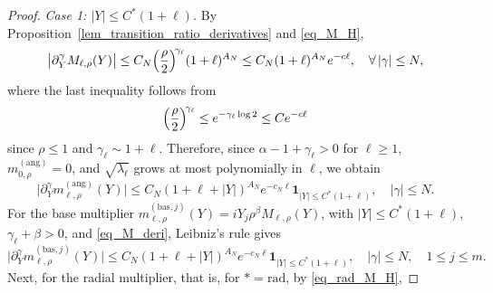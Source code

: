 \documentclass[12pt]{amsart}
\begin{document}
\begin{proof}
\textit{Case 1: $|Y|\le C^* (1+\ell)$.} 
By Proposition~\ref{lem_transition_ratio_derivatives} and \eqref{eq_M_H},
\begin{equation}\label{eq_M_deri}
    \bigl| \partial_Y^\gamma M_{\ell,\rho}(Y) \bigr| \le C_N \Bigl( \frac{\rho}{2} \Bigr)^{\!\gamma_\ell} (1+\ell)^{A_N} \le C_N (1+\ell)^{A_N} e^{-c \ell},\quad \forall\, |\gamma|\le N,
\end{equation}
where the last inequality follows from
\begin{equation*}
     \Bigl(\frac{\rho}{2}\Bigr)^{\!\gamma_\ell} \le e^{- \gamma_\ell \log 2} \le C e^{-c \ell}
\end{equation*}
since $\rho \le 1$ and $\gamma_\ell \sim 1+\ell$. Therefore, since $\alpha-1+\gamma_\ell>0$ for $\ell \ge 1$, $m_{0,\rho}^{(\mathrm{ang})}=0$, and $\sqrt{\lambda_\ell}$ grows at most polynomially in $\ell$, we obtain
\begin{equation*}
    \bigl|\partial_Y^\gamma m_{\ell,\rho}^{(\mathrm{ang})}(Y)\bigr|
    \le
    C_N
    (1+\ell+|Y|)^{A_N}
        e^{-c_N \ell}\mathbf 1_{|Y|\le C^* (1+\ell)},\quad |\gamma|\le N.
\end{equation*}
For the base multiplier $m_{\ell,\rho}^{(\mathrm{bas}, j)}(Y) = i Y_j \rho^{\beta} M_{\ell,\rho}(Y)$, with $|Y|\le C^*(1+\ell)$, $\gamma_\ell + \beta >0$, and \eqref{eq_M_deri}, Leibniz's rule gives
\begin{equation*}
    \bigl|\partial_Y^\gamma m_{\ell,\rho}^{(\mathrm{bas},j)}(Y)\bigr|
    \le
    C_N
    (1+\ell+|Y|)^{A_N}
        e^{-c_N \ell}\mathbf 1_{|Y|\le C^* (1+\ell)},\quad |\gamma|\le N,\quad 1\le j\le m.
\end{equation*}
Next, for the radial multiplier, that is, for $*=\mathrm{rad}$, by \eqref{eq_rad_M_H},

\end{proof}
\end{document}
